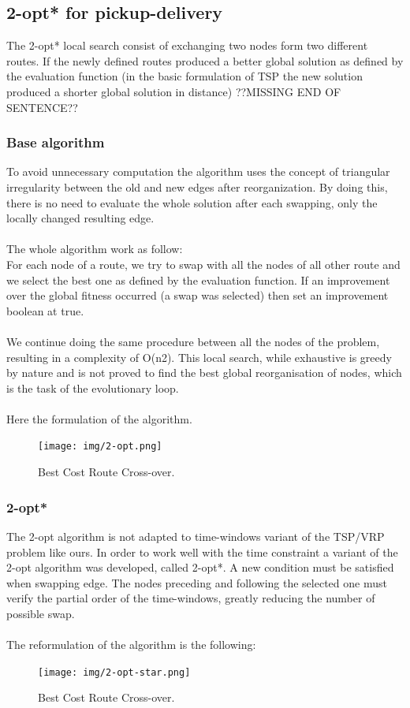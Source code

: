 \documentclass[12pt]{memoir}
\begin{document}
\subsection{2-opt* for pickup-delivery}
The 2-opt* local search consist of exchanging two nodes form two different routes. If the newly defined routes
produced a better global solution as defined by the evaluation function (in the basic formulation of TSP
the new solution produced a shorter global solution in distance) ??MISSING END OF SENTENCE??



\subsubsection{Base algorithm}
To avoid unnecessary computation the algorithm uses the concept of triangular irregularity
between the old and new edges after reorganization. By doing this, there is no need to
evaluate the whole solution after each swapping, only the locally changed resulting edge.\\
\\
The whole algorithm work as follow:\\
For each node of a route, we try to swap with all the nodes of all other route and we
select the best one as defined by the evaluation function. If an improvement over the global
fitness occurred (a swap was selected) then set an improvement boolean at true.\\
\\
We continue doing the same procedure between all the nodes of the problem, resulting in a
complexity of O(n2). This local search, while exhaustive is greedy by nature and is not proved
to find the best global reorganisation of nodes, which is the task of the evolutionary loop.\\
\\
Here the formulation of the algorithm.
\begin{figure}[htbp]
	\begin{center}
		\texttt{[image: img/2-opt.png]}
		\caption{Best Cost Route Cross-over.}
	\end{center}
\end{figure}
\subsubsection{2-opt*}
The 2-opt algorithm is not adapted to time-windows variant of the TSP/VRP problem like ours.
In order to work well with the time constraint a variant of the 2-opt algorithm was developed,
called 2-opt*. A new condition must be satisfied when swapping edge. The nodes preceding and
following the selected one must verify the partial order of the time-windows, greatly reducing
the number of possible swap.\\
\\
The reformulation of the algorithm is the following:
\begin{figure}[htbp]
	\begin{center}
		\texttt{[image: img/2-opt-star.png]}
		\caption{Best Cost Route Cross-over.}
	\end{center}
\end{figure}
\end{document}
